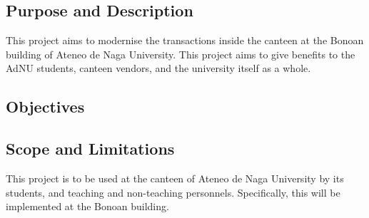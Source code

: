 \documentclass{article}
\begin{document}








\subsection{Purpose and Description}
This project aims to modernise the transactions inside the canteen at the Bonoan building of Ateneo de Naga University. This project aims to give benefits to the AdNU students, canteen vendors, and the university itself as a whole.



\subsection{Objectives}

\subsection{Scope and Limitations}
This project is to be used at the canteen of Ateneo de Naga University by its students, and teaching and non-teaching personnels. Specifically, this will be implemented at the Bonoan building. 
\end{document}
